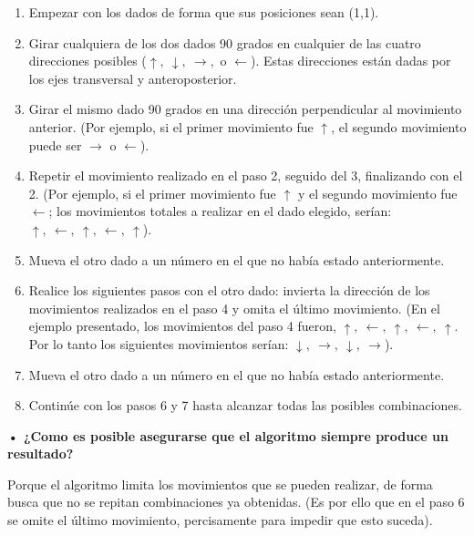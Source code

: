 \documentclass[11pt,letterpaper]{article}
\begin{document}
\begin{enumerate}
\item Empezar con los dados de forma que sus posiciones sean (1,1).
\item Girar cualquiera de los dos dados 90 grados en cualquier de las cuatro direcciones posibles ($\uparrow, \ \downarrow, \ \rightarrow, $ o $ \leftarrow$). Estas direcciones están dadas por los ejes transversal y anteroposterior.
\item Girar el mismo dado 90 grados en una dirección perpendicular al movimiento anterior. (Por ejemplo, si el primer movimiento fue $\uparrow$, el segundo movimiento puede ser $\rightarrow$ o $\leftarrow$).
\item Repetir el movimiento realizado en el paso 2, seguido del 3, finalizando con el 2. (Por ejemplo, si el primer movimiento fue $\uparrow$ y el segundo movimiento fue $\leftarrow$; los movimientos totales a realizar en el dado elegido, serían: $\uparrow, \ \leftarrow, \ \uparrow, \ \leftarrow, \ \uparrow$).
\item Mueva el otro dado a un número en el que no había estado anteriormente.
\item Realice los siguientes pasos con el otro dado: invierta la dirección de los movimientos realizados en el paso 4 y omita el último movimiento. (En el ejemplo presentado, los movimientos del paso 4 fueron, $\uparrow, \ \leftarrow, \ \uparrow, \ \leftarrow, \ \uparrow$. Por lo tanto los siguientes movimientos serían: $\downarrow, \ \rightarrow, \ \downarrow, \ \rightarrow$).
\item Mueva el otro dado a un número en el que no había estado anteriormente.
\item Continúe con los pasos 6 y 7 hasta alcanzar todas las posibles combinaciones.
\end{enumerate}

\textbf{• ¿Como es posible asegurarse que el algoritmo siempre produce un resultado?}

\noindent Porque el algoritmo limita los movimientos que se pueden realizar, de forma busca que no se repitan combinaciones ya obtenidas. (Es por ello que en el paso 6 se omite el último movimiento, percisamente para impedir que esto suceda).
\end{document}
